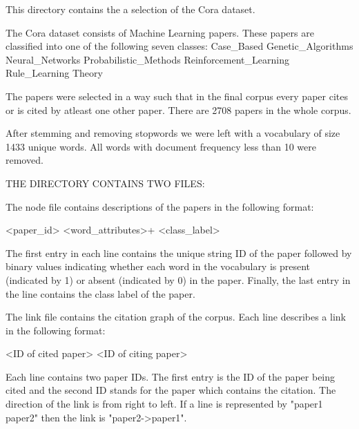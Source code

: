 This directory contains the a selection of the Cora dataset.

The Cora dataset consists of Machine Learning papers. These papers are classified into one of the following seven classes:
		Case_Based
		Genetic_Algorithms
		Neural_Networks
		Probabilistic_Methods
		Reinforcement_Learning
		Rule_Learning
		Theory

The papers were selected in a way such that in the final corpus every paper cites or is cited by atleast one other paper. There are 2708 papers in the whole corpus. 

After stemming and removing stopwords we were left with a vocabulary of size 1433 unique words. All words with document frequency less than 10 were removed.


THE DIRECTORY CONTAINS TWO FILES:

The node file contains descriptions of the papers in the following format:

		<paper_id> <word_attributes>+ <class_label>

The first entry in each line contains the unique string ID of the paper followed by binary values indicating whether each word in the vocabulary is present (indicated by 1) or absent (indicated by 0) in the paper. Finally, the last entry in the line contains the class label of the paper.

The link file contains the citation graph of the corpus. Each line describes a link in the following format:

		<ID of cited paper> <ID of citing paper>

Each line contains two paper IDs. The first entry is the ID of the paper being cited and the second ID stands for the paper which contains the citation. The direction of the link is from right to left. If a line is represented by "paper1 paper2" then the link is "paper2->paper1". 
